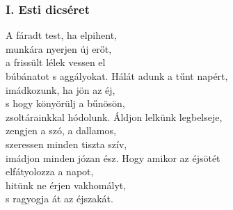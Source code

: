 \documentclass[twoside]{article}
\begin{document}
\subsubsection*{I. Esti dicséret}

\begin{hymnstanzas}
    A fáradt test, ha elpihent,\\
    munkára nyerjen új erőt,\\
    a frissült lélek vessen el\\
    búbánatot s aggályokat.
\stanzabreak
    Hálát adunk a tűnt napért,\\
    imádkozunk, ha jön az éj,\\
    s hogy könyörülj a bűnösön,\\
    zsoltárainkkal hódolunk.
\stanzabreak
    Áldjon lelkünk legbelseje,\\
    zengjen a szó, a dallamos,\\
    szeressen minden tiszta szív,\\
    imádjon minden józan ész.
\stanzabreak
    Hogy amikor az éjsötét\\
    elfátyolozza a napot,\\
    hitünk ne érjen vakhomályt,\\
    s ragyogja át az éjszakát.
\end{hymnstanzas}
\end{document}
